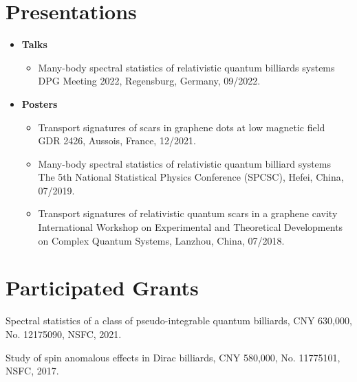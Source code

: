 \documentclass[letterpaper,10.8pt]{article}
\begin{document}
\section{Presentations}
  \begin{itemize}[font=$\bullet$]
  \item[]{\textbf{Talks}
    \begin{itemize}
        \item {Many-body spectral statistics of relativistic quantum billiards systems\\
                DPG Meeting 2022, Regensburg, Germany, 09/2022.}
    \end{itemize}}

    \item[]{\textbf{Posters}
    \begin{itemize}
        \item {Transport signatures of scars in graphene dots at low magnetic field\\
                GDR 2426, Aussois, France, 12/2021.}
        \item {Many-body spectral statistics of relativistic quantum billiard systems\\
                The 5th National Statistical Physics Conference (SPCSC), Hefei, China, 07/2019.}
        \item {Transport signatures of relativistic quantum scars in a graphene cavity\\
                International Workshop on Experimental and Theoretical Developments on Complex Quantum Systems, Lanzhou, China, 07/2018.}
    \end{itemize}}
    
\end{itemize}

\section{Participated Grants}
\begin{description}[font=$\bullet$]
\item {Spectral statistics of a class of pseudo-integrable quantum billiards, CNY 630,000, No. 12175090, NSFC, 2021.}
\item {Study of spin anomalous effects in Dirac billiards, CNY 580,000, No. 11775101, NSFC, 2017.}

\end{description}

\end{document}
